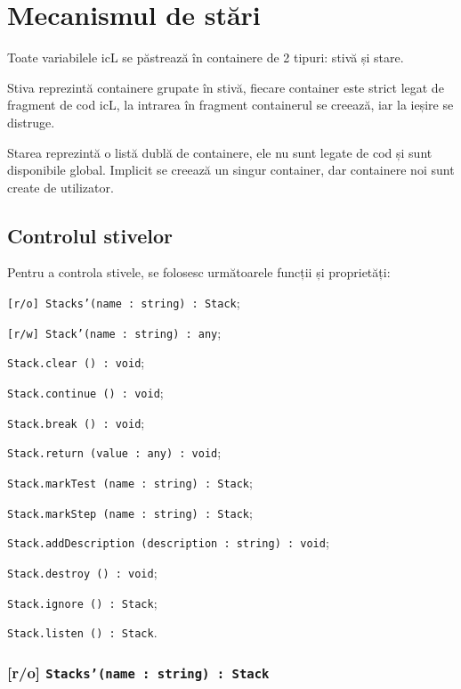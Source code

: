 \section{Mecanismul de stări}

Toate variabilele icL se păstrează în containere de 2 tipuri: stivă și stare.

Stiva reprezintă containere grupate în stivă, fiecare container este strict legat de fragment de cod icL, la intrarea în fragment containerul se creează, iar la ieșire se distruge.

Starea reprezintă o listă dublă de containere, ele nu sunt legate de cod și sunt disponibile global. Implicit se creează un singur container, dar containere noi sunt create de utilizator.

\subsection{Controlul stivelor}
\label{stack:control}

Pentru a controla stivele, se folosesc următoarele funcții și proprietăți:
\begin{icItems}
	\item \texttt{[r/o] Stacks'(name : string) : Stack};
	\item \texttt{[r/w] Stack'(name : string) : any};
	\item \texttt{Stack.clear () : void};
	\item \texttt{Stack.continue () : void};
	\item \texttt{Stack.break () : void};
	\item \texttt{Stack.return (value : any) : void};
	\item \texttt{Stack.markTest (name : string) : Stack};
	\item \texttt{Stack.markStep (name : string) : Stack};
	\item \texttt{Stack.addDescription (description : string) : void};
	\item \texttt{Stack.destroy () : void};
	\item \texttt{Stack.ignore () : Stack};
	\item \texttt{Stack.listen () : Stack}.
\end{icItems}

\subsubsection{[r/o] \texttt{Stacks'(name : string) : Stack}}

